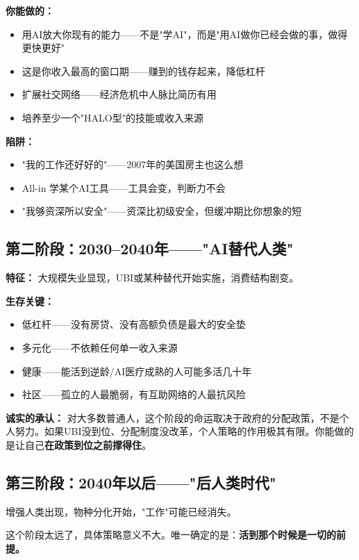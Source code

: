 \documentclass[a4paper,12pt,UTF8]{ctexart}
\begin{document}
\textbf{你能做的：}
\begin{itemize}
\item 用AI放大你现有的能力——不是"学AI"，而是"用AI做你已经会做的事，做得更快更好"
\item 这是你收入最高的窗口期——赚到的钱存起来，降低杠杆
\item 扩展社交网络——经济危机中人脉比简历有用
\item 培养至少一个"HALO型"的技能或收入来源
\end{itemize}

\textbf{陷阱：}
\begin{itemize}
\item "我的工作还好好的"——2007年的美国房主也这么想
\item All-in 学某个AI工具——工具会变，判断力不会
\item "我够资深所以安全"——资深比初级安全，但缓冲期比你想象的短
\end{itemize}

\subsection{第二阶段：2030--2040年——"AI替代人类"}

\textbf{特征：} 大规模失业显现，UBI或某种替代开始实施，消费结构剧变。

\textbf{生存关键：}
\begin{itemize}
\item 低杠杆——没有房贷、没有高额负债是最大的安全垫
\item 多元化——不依赖任何单一收入来源
\item 健康——能活到逆龄/AI医疗成熟的人可能多活几十年
\item 社区——孤立的人最脆弱，有互助网络的人最抗风险
\end{itemize}

\textbf{诚实的承认：} 对大多数普通人，这个阶段的命运取决于政府的分配政策，不是个人努力。如果UBI没到位、分配制度没改革，个人策略的作用极其有限。你能做的是让自己\textbf{在政策到位之前撑得住}。

\subsection{第三阶段：2040年以后——"后人类时代"}

增强人类出现，物种分化开始，"工作"可能已经消失。

这个阶段太远了，具体策略意义不大。唯一确定的是：\textbf{活到那个时候是一切的前提。}

\end{document}
